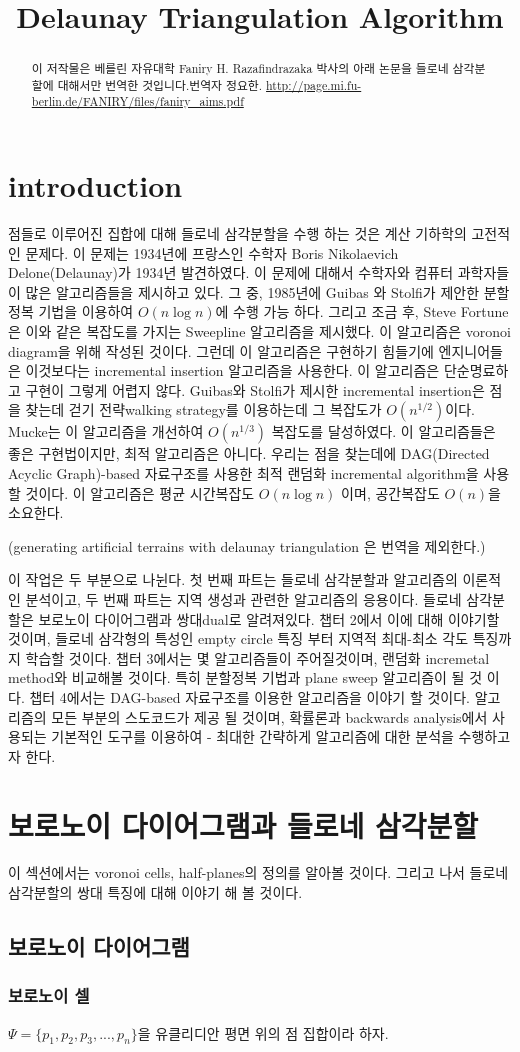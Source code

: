 \documentclass{article}
\title{Delaunay Triangulation Algorithm}
\begin{document}
\maketitle
\begin{abstract}
    이 저작물은 베를린 자유대학 Faniry H. Razafindrazaka 박사의 아래 논문을
    들로네 삼각분할에 대해서만 번역한 것입니다.번역자 정요한. 
    \url{http://page.mi.fu-berlin.de/FANIRY/files/faniry_aims.pdf}
\end{abstract}
\section{introduction}
점들로 이루어진 집합에 대해 들로네 삼각분할을 수행 하는 것은 계산 기하학의 
고전적인 문제다. 이 문제는 1934년에 프랑스인 수학자 Boris Nikolaevich Delone(Delaunay)가
1934년 발견하였다. 이 문제에 대해서 수학자와 컴퓨터 과학자들이 많은 
알고리즘들을 제시하고 있다. 그 중, 1985년에 Guibas 와 Stolfi가 제안한 
분할정복 기법을 이용하여 $O ( n \log n)$에 수행 가능 하다. 
그리고 조금 후, Steve Fortune은 이와 같은 복잡도를 가지는 Sweepline 알고리즘을 
제시했다. 이 알고리즘은 voronoi diagram을 위해 작성된 것이다. 
그런데 이 알고리즘은 구현하기 힘들기에 엔지니어들은 이것보다는 
incremental insertion 알고리즘을 사용한다. 이 알고리즘은  
단순명료하고 구현이 그렇게 어렵지 않다. Guibas와 Stolfi가 제시한 
incremental insertion은 점을 찾는데 걷기 전략walking strategy를 이용하는데 
그 복잡도가 $O(n^{1/2})$이다. Mucke는 이 알고리즘을 개선하여 $O(n^{1/3})$
복잡도를 달성하였다. 이 알고리즘들은 좋은 구현법이지만, 최적 알고리즘은 아니다. 
우리는 점을 찾는데에 DAG(Directed Acyclic Graph)-based 자료구조를 사용한 
최적 랜덤화 incremental algorithm을 사용할 것이다. 이 알고리즘은 평균 시간복잡도 
$O(n \log n)$ 이며, 공간복잡도 $O(n)$을 소요한다. 

(generating artificial terrains with delaunay triangulation 은 번역을 제외한다.)

이 작업은 두 부분으로 나뉜다. 첫 번째 파트는 들로네 삼각분할과 알고리즘의 
이론적인 분석이고, 두 번째 파트는 지역 생성과 관련한 알고리즘의 응용이다. 
들로네 삼각분할은 보로노이 다이어그램과 쌍대dual로 알려져있다. 챕터 2에서 
이에 대해 이야기할 것이며, 들로네 삼각형의 특성인 empty circle 특징 부터 
지역적 최대-최소 각도 특징까지 학습할 것이다. 챕터 3에서는 몇 알고리즘들이 
주어질것이며, 랜덤화 incremetal method와 비교해볼 것이다. 특히 분할정복 기법과
plane sweep 알고리즘이 될 것 이다. 챕터 4에서는 DAG-based 자료구조를 이용한 
알고리즘을 이야기 할 것이다. 알고리즘의 모든 부분의 스도코드가 제공 될 것이며, 
확률론과 backwards analysis에서 사용되는 기본적인 도구를 이용하여 - 최대한 
간략하게 알고리즘에 대한 분석을 수행하고자 한다. 
\pagebreak
\section{보로노이 다이어그램과 들로네 삼각분할}
이 섹션에서는 voronoi cells, half-planes의 정의를 알아볼 것이다. 
그리고 나서 들로네 삼각분할의 쌍대 특징에 대해 이야기 해 볼 것이다. 
\subsection{보로노이 다이어그램}  
\subsubsection{보로노이 셀}
$\Psi = \{ p_1, p_2, p_3, ... , p_n \} $을 유클리디안 평면 위의 
점 집합이라 하자. 
\end{document}
